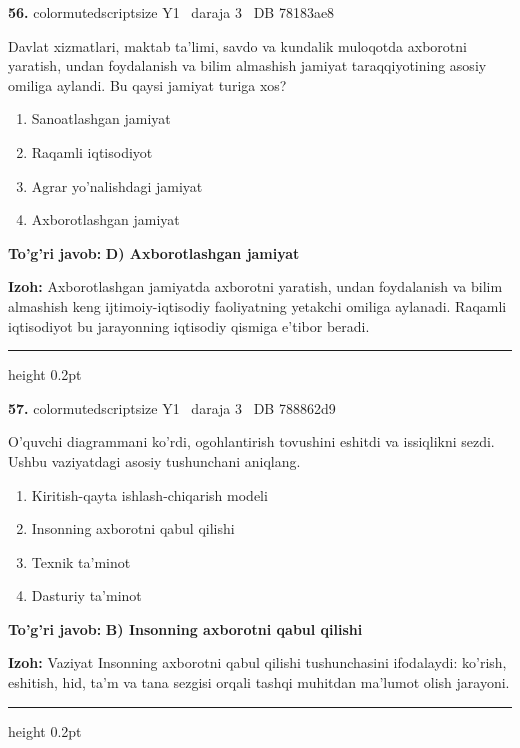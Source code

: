 \documentclass[10pt,a4paper,oneside]{article}
\begin{document}
\noindent\textbf{\color{ink}56.}  {color{muted}scriptsize Y1 \textbullet\ daraja 3 \textbullet\ DB 78183ae8}
\par
Davlat xizmatlari, maktab ta'limi, savdo va kundalik muloqotda axborotni yaratish, undan foydalanish va bilim almashish jamiyat taraqqiyotining asosiy omiliga aylandi. Bu qaysi jamiyat turiga xos?
\begin{enumerate}[label=\Alph*),leftmargin=9mm]
\item Sanoatlashgan jamiyat
\item Raqamli iqtisodiyot
\item Agrar yo'nalishdagi jamiyat
\item Axborotlashgan jamiyat
\end{enumerate}
\begin{tcolorbox}[enhanced,breakable,colback=teal!4,colframe=teal!50!black,boxrule=0.5pt,arc=1.1mm,left=3mm,right=3mm,top=1.7mm,bottom=1.7mm,before skip=2mm,after skip=2mm]
\textbf{\color{teal}To'g'ri javob:} \textbf{D) Axborotlashgan jamiyat}
\par\smallskip
\textbf{Izoh:} Axborotlashgan jamiyatda axborotni yaratish, undan foydalanish va bilim almashish keng ijtimoiy-iqtisodiy faoliyatning yetakchi omiliga aylanadi. Raqamli iqtisodiyot bu jarayonning iqtisodiy qismiga e'tibor beradi.
\end{tcolorbox}
\vspace{2mm}\hrule height 0.2pt \vspace{3mm}

\noindent\textbf{\color{ink}57.}  {color{muted}scriptsize Y1 \textbullet\ daraja 3 \textbullet\ DB 788862d9}
\par
O'quvchi diagrammani ko'rdi, ogohlantirish tovushini eshitdi va issiqlikni sezdi. Ushbu vaziyatdagi asosiy tushunchani aniqlang.
\begin{enumerate}[label=\Alph*),leftmargin=9mm]
\item Kiritish-qayta ishlash-chiqarish modeli
\item Insonning axborotni qabul qilishi
\item Texnik ta'minot
\item Dasturiy ta'minot
\end{enumerate}
\begin{tcolorbox}[enhanced,breakable,colback=teal!4,colframe=teal!50!black,boxrule=0.5pt,arc=1.1mm,left=3mm,right=3mm,top=1.7mm,bottom=1.7mm,before skip=2mm,after skip=2mm]
\textbf{\color{teal}To'g'ri javob:} \textbf{B) Insonning axborotni qabul qilishi}
\par\smallskip
\textbf{Izoh:} Vaziyat Insonning axborotni qabul qilishi tushunchasini ifodalaydi: ko'rish, eshitish, hid, ta'm va tana sezgisi orqali tashqi muhitdan ma'lumot olish jarayoni.
\end{tcolorbox}
\vspace{2mm}\hrule height 0.2pt \vspace{3mm}
\end{document}
